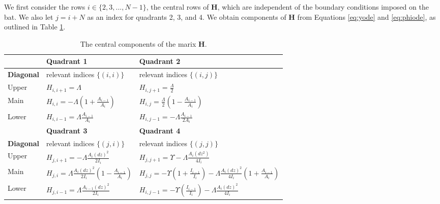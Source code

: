 \documentclass[linenumbers]{aastex7}
\begin{document}
We first consider the rows $i \in \{2, 3, ..., N-1\}$, the central rows of $\mathbf{H}$, which are independent of the boundary conditions imposed on the bat. We also let $j = i + N$ as an index for quadrants 2, 3, and 4. We obtain components of $\mathbf{H}$ from Equations \ref{eq:yode} and \ref{eq:phiode}, as outlined in Table \ref{tab:Hcomps}.


\begin{table}[h!]
    \centering
    {\renewcommand{\arraystretch}{1.6}
    \begin{tabular}{|p{}|p{}|p{}|}
        \hline
        &\textbf{Quadrant 1} & \textbf{Quadrant 2} \\ 
        \hline
        \textbf{Diagonal}&relevant indices $\{(i, i)\}$ & relevant indices $\{(i, j)\}$\\

        \hline \hline
        Upper
        & $\displaystyle H_{i,i+1} = \Lambda$
        & $\displaystyle H_{i, j+1} = \frac{\Lambda}{2}$
        \\
        Main 
        & $\displaystyle H_{i,i} = -\Lambda\left(1+\frac{A_{i-1}}{A_i}\right)$
        & $\displaystyle H_{i, j} = \frac{\Lambda}{2}\left(1 - \frac{A_{i-1}}{A_i}\right)$
        \\
        Lower
        & $\displaystyle H_{i,i-1} = \Lambda \frac{A_{i-1}}{A_i}$
        & $\displaystyle H_{i, j-1} = -\Lambda \frac{A_{i-1}}{2A_i}$
        \\

        \hline 
        \hline
        & \textbf{Quadrant 3} & \textbf{Quadrant 4} \\ 
        \hline
        \textbf{Diagonal}& relevant indices $\{(j, i)\}$ & relevant indices $\{(j, j)\}$\\

        \hline \hline
        Upper
        & $\displaystyle H_{j,i+1} = -\Lambda \frac{A_i(dz)^2}{2I_i}$
        & $\displaystyle H_{j, j+1} = \Upsilon - \Lambda \frac{A_i (dz^2)}{4I_i}$
        \\
        Main 
        & $\displaystyle H_{j,i} = \Lambda \frac{A_i (dz)^2}{2I_i}\left(1 - \frac{A_{i-1}}{A_i}\right)$
        & $\displaystyle H_{j, j} = -\Upsilon\left(1 + \frac{I_{i-1}}{I_i}\right) - \Lambda\frac{A_i (dz)^2}{4I_i}\left(1+\frac{A_{i-1}}{A_i}\right) $
        \\
        Lower
        & $\displaystyle H_{j,i-1} = \Lambda \frac{A_{i-1}(dz)^2}{2I_i}$
        & $\displaystyle H_{i, j-1} = -\Upsilon\left(\frac{I_{i-1}}{I_i}\right) - \Lambda\frac{A_i (dz)^2}{4I_i}$
        
        \\
        \hline
    \end{tabular}
    }
    \caption{The central components of the marix $\mathbf{H}$.}
    \label{tab:Hcomps}
\end{table}
\end{document}
